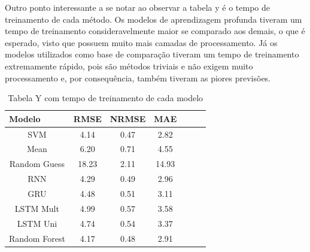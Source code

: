 Outro  ponto  interessante  a  se  notar ao observar a tabela y  é  o  tempo  de  treinamento de cada método. Os modelos de aprendizagem profunda tiveram um tempo de treinamento consideravelmente maior se comparado aos demais, o que é esperado, visto que possuem muito mais camadas de processamento. Já os  modelos  utilizados  como  base  de  comparação  tiveram um  tempo  de treinamento  extremamente  rápido,  pois  são métodos triviais  e  não  exigem  muito  processamento  e,  por consequência, também tiveram as piores previsões.


\begin{table}[htbp]
    \caption{Tabela Y com tempo de treinamento de cada modelo}
    \label{table:comp_training}
    \begin{center}
    \begin{tabular}{ccccccc}
    \hline
    \multicolumn{1}{l}{\textbf{Modelo}} & \multicolumn{1}{l}{\textbf{RMSE}} & \multicolumn{1}{l}{\textbf{NRMSE}} & \multicolumn{1}{l}{\textbf{MAE}} \\
    \hline
    SVM & 4.14 & 0.47 & 2.82  \\
    Mean & 6.20 & 0.71 & 4.55 \\
    Random Guess & 18.23 & 2.11 & 14.93\\
    RNN & 4.29 & 0.49 & 2.96 \\ 
    GRU & 4.48 & 0.51 & 3.11  \\ 
    LSTM Mult & 4.99 &  0.57 & 3.58  \\ 
    LSTM Uni & 4.74 &  0.54 & 3.37  \\ 
    Random Forest & 4.17 & 0.48 & 2.91 \\
    \hline
    \end{tabular}
    \end{center}
\end{table}